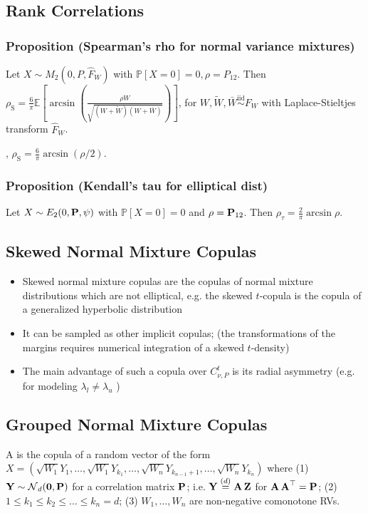 \subsection*{Rank Correlations}
\subsubsection*{Proposition (Spearman’s rho for normal variance mixtures)}
Let $X \sim M_{2}\left(0, P, \hat{F}_{W}\right)$ with $\mathbb{P}[X=0]=0, \rho=P_{12}$. Then
$
\rho_{\mathrm{S}}=\frac{6}{\pi} \mathbb{E}\left[\arcsin \left(\frac{\rho W}{\sqrt{(W+\tilde{W})(W+\bar{W})}}\right)\right]
$, for $W, \tilde{W}, \bar{W} \stackrel{\mathrm{iid}}{\sim} F_{W}$ with Laplace-Stieltjes transform $\hat{F}_{W}$. 

, $\rho_{\mathrm{S}}=\frac{6}{\pi} \arcsin (\rho / 2)$.


\subsubsection*{Proposition (Kendall's tau for elliptical dist)}
Let $X \sim E_{2}(0, \boldsymbol{\mathbf{P}}, \psi)$ with $\mathbb{P}[X=0]=0$ and $\rho=\boldsymbol{\mathbf{P}}_{12}$. Then $\rho_{\tau}=\frac{2}{\pi} \arcsin \rho$.







\subsection*{Skewed Normal Mixture Copulas}
\begin{itemize}[leftmargin=*]
    \item Skewed normal mixture copulas are the copulas of normal mixture distributions which are not elliptical, e.g. the skewed $t$-copula is the copula of a generalized hyperbolic distribution
    \item It can be sampled as other implicit copulas;
(the transformations of the margins requires numerical integration of a skewed $t$-density)
    \item The main advantage of such a copula over $C_{\nu, P}^{t}$ is its radial asymmetry (e.g. for modeling $\lambda_{l} \neq \lambda_{u}$ )
\end{itemize}



\subsection*{Grouped Normal Mixture Copulas}
A  is the copula of a random vector of the form $X=\left(\sqrt{W_{1}} Y_{1}, \ldots, \sqrt{W_{1}} Y_{k_{1}}, \ldots, \sqrt{W_{n}} Y_{k_{n-1}+1}, \ldots, \sqrt{W_{n}} Y_{k_{n}}\right) $ where
(1) $\operatorname{\boldsymbol{\mathbf{Y}}} \sim \operatorname{\mathcal{N}}_{d}(\boldsymbol{\mathbf{0}}, \boldsymbol{\mathbf{P}})$ for a correlation matrix $\boldsymbol{\mathbf{P}}$; i.e. $\operatorname{\boldsymbol{\mathbf{Y}}} \stackrel{(d)}{=} \operatorname{\boldsymbol{\mathbf{A}}} \operatorname{\boldsymbol{\mathbf{Z}}}$ for $\operatorname{\boldsymbol{\mathbf{A}}} \operatorname{\boldsymbol{\mathbf{A}}}^{\operatorname{\top}}=\boldsymbol{\mathbf{P}}$; (2) $1 \leq k_{1} \leq k_{2} \leq \ldots \leq k_{n}=d$; (3) $W_{1}, \ldots, W_{n}$ are non-negative comonotone RVs.



